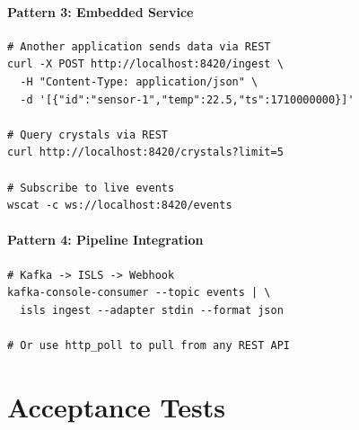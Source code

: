 \documentclass[11pt,a4paper,twoside]{article}
\theoremstyle{definition}
\theoremstyle{plain}
\theoremstyle{remark}
\begin{document}
\subsection{Pattern 3: Embedded Service}

\begin{lstlisting}
# Another application sends data via REST
curl -X POST http://localhost:8420/ingest \
  -H "Content-Type: application/json" \
  -d '[{"id":"sensor-1","temp":22.5,"ts":1710000000}]'

# Query crystals via REST
curl http://localhost:8420/crystals?limit=5

# Subscribe to live events
wscat -c ws://localhost:8420/events
\end{lstlisting}

\subsection{Pattern 4: Pipeline Integration}

\begin{lstlisting}
# Kafka -> ISLS -> Webhook
kafka-console-consumer --topic events | \
  isls ingest --adapter stdin --format json

# Or use http_poll to pull from any REST API
\end{lstlisting}


\part{Acceptance Tests}\label{part:tests}
\end{document}
